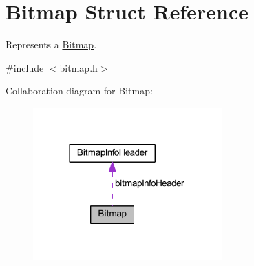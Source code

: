 \hypertarget{struct_bitmap}{}\section{Bitmap Struct Reference}
\label{struct_bitmap}


Represents a \mbox{\hyperlink{struct_bitmap}{Bitmap}}.  




{\ttfamily \#include $<$bitmap.\+h$>$}



Collaboration diagram for Bitmap\+:\nopagebreak
\begin{figure}[H]
\begin{center}
\leavevmode
\includegraphics[width=206pt]{struct_bitmap__coll__graph}
\end{center}
\end{figure}
